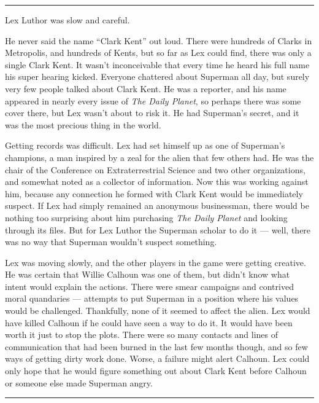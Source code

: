 \begin{center}\rule{0.5\linewidth}{\linethickness}\end{center}

Lex Luthor was slow and careful.

He never said the name ``Clark Kent'' out loud. There were hundreds of
Clarks in Metropolis, and hundreds of Kents, but so far as Lex could
find, there was only a single Clark Kent. It wasn't inconceivable that
every time he heard his full name his super hearing kicked. Everyone
chattered about Superman all day, but surely very few people talked
about Clark Kent. He was a reporter, and his name appeared in nearly
every issue of \emph{The Daily Planet}, so perhaps there was some cover
there, but Lex wasn't about to risk it. He had Superman's secret, and it
was the most precious thing in the world.

Getting records was difficult. Lex had set himself up as one of
Superman's champions, a man inspired by a zeal for the alien that few
others had. He was the chair of the Conference on Extraterrestrial
Science and two other organizations, and somewhat noted as a collector
of information. Now this was working against him, because any connection
he formed with Clark Kent would be immediately suspect. If Lex had
simply remained an anonymous businessman, there would be nothing too
surprising about him purchasing \emph{The Daily Planet} and looking
through its files. But for Lex Luthor the Superman scholar to do it ---
well, there was no way that Superman wouldn't suspect something.

Lex was moving slowly, and the other players in the game were getting
creative. He was certain that Willie Calhoun was one of them, but didn't
know what intent would explain the actions. There were smear campaigns
and contrived moral quandaries --- attempts to put Superman in a
position where his values would be challenged. Thankfully, none of it
seemed to affect the alien. Lex would have killed Calhoun if he could
have seen a way to do it. It would have been worth it just to stop the
plots. There were so many contacts and lines of communication that had
been burned in the last few months though, and so few ways of getting
dirty work done. Worse, a failure might alert Calhoun. Lex could only
hope that he would figure something out about Clark Kent before Calhoun
or someone else made Superman angry.

\begin{center}\rule{0.5\linewidth}{\linethickness}\end{center}

